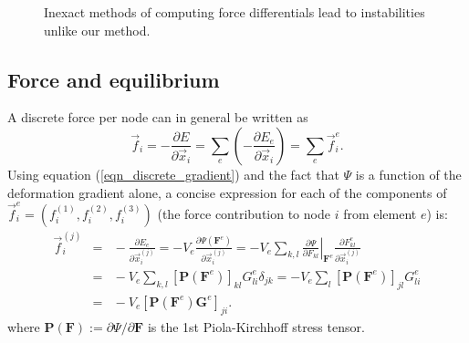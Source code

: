 \begin{figure}[th]
\caption{Inexact methods of computing force differentials lead to instabilities
unlike our method. }
\label{fig:warpedstiff}
\end{figure}

\subsection{Force and equilibrium}
\label{sec:force}

A discrete force per node can in general be written as
\begin{equation}
\vec{f}_i=-\frac{\partial E}{\partial\vec{x}_i}=\sum_e\left(-\frac{\partial E_e}{\partial\vec{x}_i}\right)=\sum_e\vec{f}_i^e.
\label{eqn_elemental_forces}
\end{equation}
 Using equation (\ref{eqn_discrete_gradient}) and the fact that $\Psi$ is a function of the deformation gradient alone, a concise expression for each of the components
of $\vec{f}_i^e=(f_i^{(1)},f_i^{(2)},f_i^{(3)})$ (the force contribution to node $i$ from element $e$) is: 
\begin{eqnarray}
\vec{f}_i^{(j)}\!\!\!&\!\!\!=\!\!\!&\!\!\!-\frac{\partial E_e}{\partial\vec{x}_i^{(j)}}=-V_e\frac{\partial\Psi(\mathbf{F}^e)}{\partial\vec{x}_i^{(j)}}
=
-V_e\sum_{k,l}\left.\frac{\partial\Psi}{\partial F_{kl}}\right|_{\mathbf{F}^e}\frac{\partial F_{kl}^e}{\partial\vec{x}_i^{(j)}} \nonumber \\
\!\!\!&\!\!\!=\!\!\!&\!\!\!
-V_e\sum_{k,l}[\mathbf{P}(\mathbf{F}^e)]_{kl}G_{li}^e\delta_{jk}
=
-V_e\sum_l[\mathbf{P}(\mathbf{F}^e)]_{jl}G_{li}^e \nonumber \\
\!\!\!&\!\!\!=\!\!\!&\!\!\!
-V_e[\mathbf{P}(\mathbf{F}^e)\mathbf{G}^e]_{ji}.
\label{eqn_nodal_forces}
\end{eqnarray}
where $\mathbf{P}(\mathbf{F})\!:=\!\partial\Psi/\partial\mathbf{F}$ is
the 1st Piola-Kirchhoff stress tensor.

